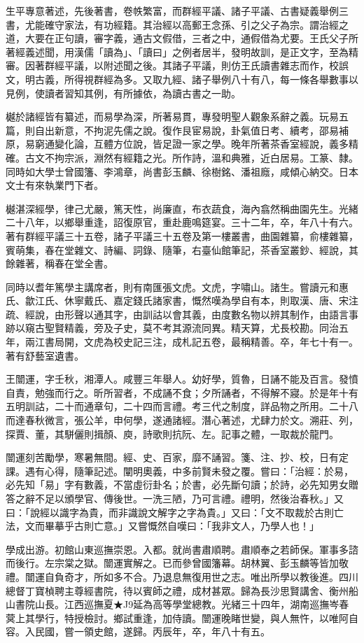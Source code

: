 \begin{pinyinscope}
生平專意著述，先後著書，卷帙繁富，而群經平議、諸子平議、古書疑義舉例三書，尤能確守家法，有功經籍。其治經以高郵王念孫、引之父子為宗。謂治經之道，大要在正句讀，審字義，通古文假借，三者之中，通假借為尤要。王氏父子所著經義述聞，用漢儒「讀為」、「讀曰」之例者居半，發明故訓，是正文字，至為精審。因著群經平議，以附述聞之後。其諸子平議，則仿王氏讀書雜志而作，校誤文，明古義，所得視群經為多。又取九經、諸子舉例八十有八，每一條各舉數事以見例，使讀者習知其例，有所據依，為讀古書之一助。

樾於諸經皆有纂述，而易學為深，所著易貫，專發明聖人觀象系辭之義。玩易五篇，則自出新意，不拘泥先儒之說。復作艮宦易說，卦氣值日考、續考，邵易補原，易窮通變化論，互體方位說，皆足證一家之學。晚年所著茶香室經說，義多精確。古文不拘宗派，淵然有經籍之光。所作詩，溫和典雅，近白居易。工篆、隸。同時如大學士曾國籓、李鴻章，尚書彭玉麟、徐樹銘、潘祖廕，咸傾心納交。日本文士有來執業門下者。

樾湛深經學，律己尤嚴，篤天性，尚廉直，布衣蔬食，海內翕然稱曲園先生。光緒二十八年，以鄉舉重逢，詔復原官，重赴鹿鳴筵宴。三十二年，卒，年八十有六。著有群經平議三十五卷，諸子平議三十五卷及第一樓叢書，曲園雜纂，俞樓雜纂，賓萌集，春在堂雜文、詩編、詞錄、隨筆，右臺仙館筆記，茶香室叢鈔、經說，其餘雜著，稱春在堂全書。

同時以耆年篤學主講席者，則有南匯張文虎。文虎，字嘯山。諸生。嘗讀元和惠氏、歙江氏、休寧戴氏、嘉定錢氏諸家書，慨然嘆為學自有本，則取漢、唐、宋注疏、經說，由形聲以通其字，由訓詁以會其義，由度數名物以辨其制作，由語言事跡以窺古聖賢精義，旁及子史，莫不考其源流同異。精天算，尤長校勘。同治五年，兩江書局開，文虎為校史記三注，成札記五卷，最稱精善。卒，年七十有一。著有舒藝室遺書。

王闓運，字壬秋，湘潭人。咸豐三年舉人。幼好學，質魯，日誦不能及百言。發憤自責，勉強而行之。昕所習者，不成誦不食；夕所誦者，不得解不寢。於是年十有五明訓詁，二十而通章句，二十四而言禮。考三代之制度，詳品物之所用。二十八而達春秋微言，張公羊，申何學，遂通諸經。潛心著述，尤肆力於文。溯莊、列，探賈、董，其駢儷則揖顏、庾，詩歌則抗阮、左。記事之體，一取裁於龍門。

闓運刻苦勵學，寒暑無間。經、史、百家，靡不誦習。箋、注、抄、校，日有定課。遇有心得，隨筆記述。闡明奧義，中多前賢未發之覆。嘗曰：「治經：於易，必先知「易」字有數義，不當虛衍卦名；於書，必先斷句讀；於詩，必先知男女贈答之辭不足以頒學官、傳後世。一洗三陋，乃可言禮。禮明，然後治春秋。」又曰：「說經以識字為貴，而非識說文解字之字為貴。」又曰：「文不取裁於古則亡法，文而畢摹乎古則亡意。」又嘗慨然自嘆曰：「我非文人，乃學人也！」

學成出游。初館山東巡撫崇恩。入都。就尚書肅順聘。肅順奉之若師保。軍事多諮而後行。左宗棠之獄。闓運實解之。已而參曾國籓幕。胡林翼、彭玉麟等皆加敬禮。闓運自負奇才，所如多不合。乃退息無復用世之志。唯出所學以教後進。四川總督丁寶楨聘主尊經書院，待以賓師之禮，成材甚眾。歸為長沙思賢講舍、衡州船山書院山長。江西巡撫夏★J9延為高等學堂總教。光緒三十四年，湖南巡撫岑春蓂上其學行，特授檢討。鄉試重逢，加侍讀。闓運晚睹世變，與人無忤，以唯阿自容。入民國，嘗一領史館，遂歸。丙辰年，卒，年八十有五。


\end{pinyinscope}
